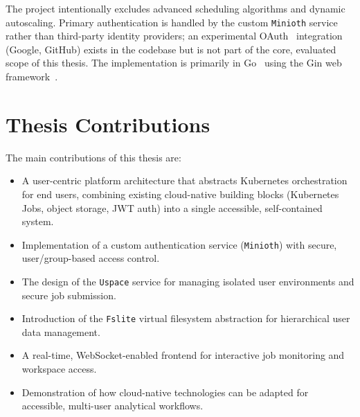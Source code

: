 The project intentionally excludes advanced scheduling algorithms and dynamic autoscaling. Primary authentication is
handled by the custom \texttt{Minioth} service rather than third-party identity providers; an experimental OAuth~\cite{oauth2-rfc6749}
integration (Google, GitHub) exists in the codebase but is not part of the core, evaluated scope of this thesis.
The implementation is primarily in Go~\cite{golang} using the Gin web framework~\cite{gingonic}.

\section{Thesis Contributions}
\hspace{2mm}The main contributions of this thesis are:
\begin{itemize}
    \item A user-centric platform architecture that abstracts Kubernetes orchestration for end users, combining
    existing cloud-native building blocks (Kubernetes Jobs, object storage, JWT auth) into a single accessible,
    self-contained system.
    \item Implementation of a custom authentication service (\texttt{Minioth}) with secure, user/group-based access control.
    \item The design of the \texttt{Uspace} service for managing isolated user environments and secure job submission.
    \item Introduction of the \texttt{Fslite} virtual filesystem abstraction for hierarchical user data management.
    \item A real-time, WebSocket-enabled frontend for interactive job monitoring and workspace access.
    \item Demonstration of how cloud-native technologies can be adapted for accessible, multi-user analytical workflows.
\end{itemize}


\newpage
